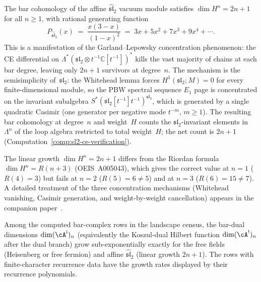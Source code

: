 \begin{remark}
\label{rem:garland-lepowsky-sl2}
The bar cohomology of the affine $\widehat{\mathfrak{sl}}_2$
vacuum module satisfies $\dim H^n = 2n+1$ for all $n \geq 1$,
with rational generating function
\[
 P_{\widehat{\mathfrak{sl}}_2}(x)
 \;=\; \frac{x(3-x)}{(1-x)^2}
 \;=\; 3x + 5x^2 + 7x^3 + 9x^4 + \cdots.
\]
This is a manifestation of the Garland--Lepowsky concentration
phenomenon: the CE differential on
$\Lambda^*(\mathfrak{sl}_2 \otimes t^{-1}\mathbb{C}[t^{-1}])^*$
kills the vast majority of chains at each bar degree,
leaving only $2n+1$ survivors at degree~$n$. The
mechanism is the semisimplicity of~$\mathfrak{sl}_2$:
the Whitehead lemma forces $H^1(\mathfrak{sl}_2; M) = 0$
for every finite-dimensional module, so the PBW
spectral sequence $E_1$ page is concentrated on the
invariant subalgebra
$S^*(\mathfrak{sl}_2[t^{-1}]t^{-1})^{\mathfrak{sl}_2}$,
which is generated by a single quadratic Casimir
(one generator per negative mode $t^{-m}$, $m \geq 1$).
The resulting bar cohomology at degree~$n$ and weight~$H$
counts the $\mathfrak{sl}_2$-invariant elements
in $\Lambda^n$ of the loop algebra restricted to
total weight~$H$; the net count is $2n+1$
(Computation~\ref{comp:sl2-ce-verification}).

The linear growth $\dim H^n = 2n+1$ differs from the Riordan formula
$\dim H^n = R(n+3)$ (OEIS~A005043), which gives the
correct value at $n = 1$ ($R(4) = 3$) but
fails at $n = 2$ ($R(5) = 6 \neq 5$) and
at $n = 3$ ($R(6) = 15 \neq 7$).
A detailed treatment of the three concentration mechanisms
(Whitehead vanishing, Casimir generation, and
weight-by-weight cancellation) appears in the
companion paper~\cite{Lor-GL}.
\end{remark}

\begin{corollary}
\label{cor:subexp-free-field}
Among the computed bar-complex rows in the landscape census, the
bar-dual dimensions
$\dim(\cA^{\mathrm i})_n$ \textup{(}equivalently the Koszul-dual Hilbert
function $\dim(\cA^!)_n$ after the dual branch\textup{)} grow
sub-exponentially exactly for the free fields (Heisenberg or free
fermion) and affine
$\widehat{\mathfrak{sl}}_2$ (linear growth $2n{+}1$).  The rows with
finite-character recurrence data have the growth rates displayed by
their recurrence polynomials.
\end{corollary}

